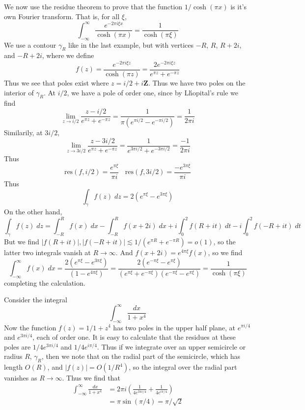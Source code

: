 \begin{example}
    We now use the residue theorem to prove that the function $1/\cosh(\pi x)$ is it's own Fourier transform. That is, for all $\xi$,
    \[ \int_{-\infty}^\infty \frac{e^{- 2\pi i \xi x}}{\cosh(\pi x)} = \frac{1}{\cosh(\pi \xi)} \]
    We use a contour $\gamma_R$ like in the last example, but with vertices $-R$, $R$, $R + 2i$, and $-R + 2i$, where we define
    \[ f(z) = \frac{e^{-2 \pi i \xi z}}{\cosh(\pi z)} = \frac{2 e^{-2\pi i \xi z}}{e^{\pi z} + e^{-\pi z}} \]
    Thus we see that poles exist where $z = i /2 + i \mathbf{Z}$. Thus we have two poles on the interior of $\gamma_R$. At $i/2$, we have a pole of order one, since by L\'{h}opital's rule we find
    \[ \lim_{z \to i/2} \frac{z - i/2}{e^{\pi z} + e^{- \pi z}} = \frac{1}{\pi(e^{\pi i/2} - e^{- \pi i/2})} = \frac{1}{2 \pi i} \]
    Similarily, at $3i/2$,
    \[ \lim_{z \to 3i/2} \frac{z - 3i/2}{e^{\pi z} + e^{- \pi z}} = \frac{1}{e^{3 \pi i/2} + e^{-3\pi i/2}} = \frac{-1}{2 \pi i} \]
    Thus
    \[ \text{res}(f,i/2) = \frac{e^{\pi \xi}}{\pi i}\ \ \ \ \text{res}(f,3i/2) = \frac{-e^{3 \pi \xi}}{\pi i} \]
    Thus
    \[ \int_\gamma f(z)\; dz = 2 \left( e^{\pi \xi} - e^{3 \pi \xi} \right) \]
    On the other hand,
    \[ \int_\gamma f(z)\; dz = \int_{-R}^R f(x)\; dx - \int_{-R}^R f(x + 2i)\; dx + i \int_0^{2} f(R + it)\; dt - i \int_0^2 f(-R + it)\; dt \]
    But we find $|f(R + it)|, |f(-R+it)| \lesssim 1/(e^{\pi R} + e^{-\pi R}) = o(1)$, so the latter two integrals vanish at $R \to \infty$. And $f(x + 2i) = e^{4 \pi \xi} f(x)$, so we find
    \[ \int_{-\infty}^\infty f(x)\; dx = \frac{2(e^{\pi \xi} - e^{3 \pi \xi})}{(1 - e^{4 \pi \xi})} = \frac{2(e^{- \pi \xi} - e^{\pi \xi})}{(e^{\pi \xi} + e^{- \pi \xi})(e^{- \pi \xi} - e^{\pi \xi})} = \frac{1}{\cosh(\pi \xi)} \]
    completing the calculation.
\end{example}

\begin{example}
    Consider the integral
    \[ \int_{-\infty}^\infty \frac{dx}{1 + x^4} \]
    Now the function $f(z) = 1/1 + z^4$ has two poles in the upper half plane, at $e^{\pi i/4}$ and $e^{3 \pi i /4}$, each of order one. It is easy to calculate that the residues at these poles are $1/4e^{3\pi i /4}$ and $1/4e^{i \pi/4}$. Thus if we integrate over an upper semicircle or radius $R$, $\gamma_R$, then we note that on the radial part of the semicircle, which has length $O(R)$, and $|f(z)| = O(1/R^4)$, so the integral over the radial part vanishes as $R \to \infty$. Thus we find that
    \begin{align*}
        \int_{-\infty}^\infty \frac{dx}{1 + x^4} &= 2 \pi i \left( \frac{1}{4e^{3 \pi i/4}} + \frac{1}{4e^{i \pi/4}} \right)\\
        &= \pi \sin(\pi/4) = \pi/\sqrt{2}
    \end{align*}
\end{example}

